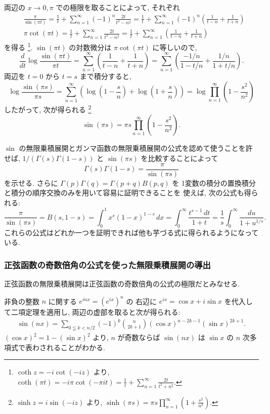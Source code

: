 \documentclass[12pt,twoside]{jarticle}
\theoremstyle{jplain}
\theoremstyle{jplain}
\theoremstyle{jplain}
\numberwithin{theorem}{section}
\numberwithin{equation}{section}
\numberwithin{figure}{section}
\numberwithin{table}{section}
\begin{document}
両辺の $x\to 0,\pi$ での極限を取ることによって, それぞれ
\begin{align*}
&
\frac{\pi}{\sin(\pi t)}
=\frac{1}{t} + \sum_{n=1}^\infty(-1)^n\frac{2t}{t^2-n^2}
=\frac{1}{t} + \sum_{n=1}^\infty(-1)^n\left(\frac{1}{t-n}+\frac{1}{t+n}\right)
\\ &
\pi\cot(\pi t)
=\frac{1}{t} + \sum_{n=1}^\infty\frac{2t}{t^2-n^2}
=\frac{1}{t} + \sum_{n=1}^\infty\left(\frac{1}{t-n}+\frac{1}{t+n}\right)
\end{align*}
を得る%
\footnote{$\coth z=-i\cot(-iz)$ より,
\(\displaystyle
\coth(\pi t)=-i\pi\cot(-\pi i t)
=\frac{1}{t} + \sum_{n=1}^\infty\frac{2t}{t^2+n^2}.
\)}.
$\sin(\pi t)$ の対数微分は $\pi\cot(\pi t)$ に等しいので,
\[
\frac{d}{dt}\log\frac{\sin(\pi t)}{\pi t}
=\sum_{n=1}^\infty\left(\frac{1}{t-n}+\frac{1}{t+n}\right)
=\sum_{n=1}^\infty\left( \frac{-1/n}{1-t/n} + \frac{1/n}{1+t/n} \right).
\]
両辺を $t=0$ から $t=s$ まで積分すると,
\[
\log\frac{\sin(\pi s)}{\pi s}
=\sum_{n=1}^\infty
\left(\log\left( 1-\frac{s}{n} \right)+\log\left( 1+\frac{s}{n} \right)\right)
=\log\prod_{n=1}^\infty\left( 1-\frac{s^2}{n^2} \right)
\]
したがって, 次が得られる%
\footnote{$\sinh z=i\sin(-iz)$ より,
\(\displaystyle
\sinh(\pi s)=\pi s \prod_{n=1}^\infty\left(1+\frac{s^2}{n^2}\right).
\)
}
\[
\sin(\pi s)
=\pi s \prod_{n=1}^\infty\left( 1-\frac{s^2}{n^2} \right).
\]

$\sin$ の無限乗積展開とガンマ函数の無限乗積展開の公式を認めて使うことを許せば,
$1/(\Gamma(s)\Gamma(1-s))$ と $\sin(\pi s)$ を比較することによって
\[
\Gamma(s)\Gamma(1-s)=\frac{\pi}{\sin(\pi s)}
\]
を示せる. さらに $\Gamma(p)\Gamma(q)=\Gamma(p+q)B(p,q)$ を
1変数の積分の置換積分と積分の順序交換のみを用いて容易に証明できることを
使えば, 次の公式も得られる:
\[
\frac{\pi}{\sin(\pi s)}
=B(s,1-s)
=\int_0^1x^s(1-x)^{1-s}\,dx
=\int_0^\infty \frac{t^{s-1}\,dt}{1+t}
=\frac{1}{s}\int_0^\infty\frac{du}{1+u^{1/s}}.
\]
これらの公式はどれか一つを証明できれば他も芋づる式に得られるようになっている.

\subsubsection{正弦函数の奇数倍角の公式を使った無限乗積展開の導出}
\label{sub:prod-sin2}

正弦函数の無限乗積展開は正弦函数の奇数倍角の公式の極限だとみなせる.

非負の整数 $n$ に関する $e^{inx} = (e^{ix})^n$ の
右辺に $e^{ix} = \cos x + i\sin x$ を代入して二項定理を適用し,
両辺の虚部を取ると次が得られる:
\begin{align*}
  \sin(nx) = \sum_{0\leqq k<n/2}
  (-1)^k\binom{n}{2k+1} (\cos x)^{n-2k-1}(\sin x)^{2k+1}.
\end{align*}
$(\cos x)^2=1-(\sin x)^2$ より, $n$ が奇数ならば $\sin(nx)$ は $\sin x$
の $n$ 次多項式で表わされることがわかる.
\end{document}

